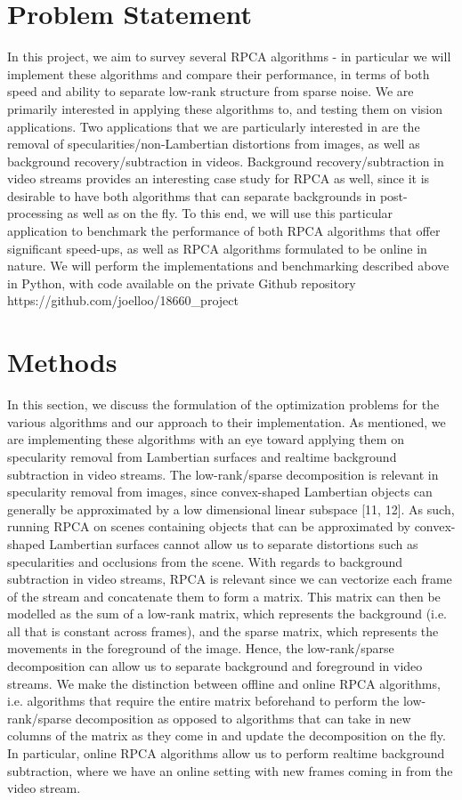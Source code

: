 \documentclass[oneside]{article}
\begin{document}
\section{Problem Statement}
In this project, we aim to survey several RPCA algorithms - in particular we will implement these algorithms and compare their performance, in terms of both speed and ability to separate low-rank structure from sparse noise. We are primarily interested in applying these algorithms to, and testing them on vision applications. Two applications that we are particularly interested in are the removal of specularities/non-Lambertian distortions from images, as well as background recovery/subtraction in videos. Background recovery/subtraction in video streams provides an interesting case study for RPCA as well, since it is desirable to have both algorithms that can separate backgrounds in post-processing as well as on the fly. To this end, we will use this particular application to benchmark the performance of both RPCA algorithms that offer significant speed-ups, as well as RPCA algorithms formulated to be online in nature. We will perform the implementations and benchmarking described above in Python, with code available on the private Github repository https://github.com/joelloo/18660\_project
\section{Methods}
In this section, we discuss the formulation of the optimization problems for the various algorithms and our approach to their implementation. As mentioned, we are implementing these algorithms with an eye toward applying them on specularity removal from Lambertian surfaces and realtime background subtraction in video streams. The low-rank/sparse decomposition is relevant in specularity removal from images, since convex-shaped Lambertian objects can generally be approximated by a low dimensional linear subspace [11, 12]. As such, running RPCA on scenes containing objects that can be approximated by convex-shaped Lambertian surfaces cannot allow us to separate distortions such as specularities and occlusions from the scene. With regards to background subtraction in video streams, RPCA is relevant since we can vectorize each frame of the stream and concatenate them to form a matrix. This matrix can then be modelled as the sum of a low-rank matrix, which represents the background (i.e. all that is constant across frames), and the sparse matrix, which represents the movements in the foreground of the image. Hence, the low-rank/sparse decomposition can allow us to separate background and foreground in video streams.\newline\newline
We make the distinction between offline and online RPCA algorithms, i.e. algorithms that require the entire matrix beforehand to perform the low-rank/sparse decomposition as opposed to algorithms that can take in new columns of the matrix as they come in and update the decomposition on the fly. In particular, online RPCA algorithms allow us to perform realtime background subtraction, where we have an online setting with new frames coming in from the video stream.
\end{document}

